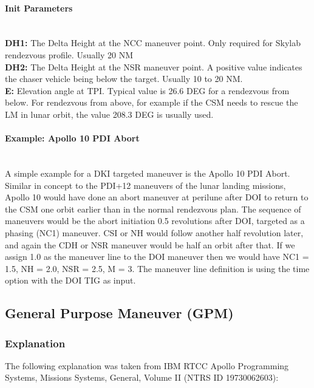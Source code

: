 \documentclass[11pt]{article} %
\begin{document}
\paragraph{Init Parameters}\mbox{} \\

\textbf{DH1:} The Delta Height at the NCC maneuver point. Only required for Skylab rendezvous profile. Usually 20 NM\\
\textbf{DH2:} The Delta Height at the NSR maneuver point. A positive value indicates the chaser vehicle being below the target. Usually 10 to 20 NM.\\
\textbf{E:} Elevation angle at TPI. Typical value is 26.6 DEG for a rendezvous from below. For rendezvous from above, for example if the CSM needs to rescue the LM in lunar orbit, the value 208.3 DEG is usually used.\\

\paragraph{Example: Apollo 10 PDI Abort}\mbox{} \\

A simple example for a DKI targeted maneuver is the Apollo 10 PDI Abort. Similar in concept to the PDI+12 maneuvers of the lunar landing missions, Apollo 10 would have done an abort maneuver at perilune after DOI to return to the CSM one orbit earlier than in the normal rendezvous plan. The sequence of maneuvers would be the abort initiation 0.5 revolutions after DOI, targeted as a phasing (NC1) maneuver. CSI or NH would follow another half revolution later, and again the CDH or NSR maneuver would be half an orbit after that. If we assign 1.0 as the maneuver line to the DOI maneuver then we would have NC1 = 1.5, NH = 2.0, NSR = 2.5, M = 3. The maneuver line definition is using the time option with the DOI TIG as input.

\newpage
\subsection{General Purpose Maneuver (GPM)}

\subsubsection{Explanation}

The following explanation was taken from IBM RTCC Apollo Programming Systems, Missions Systems, General, Volume II (NTRS ID 19730062603):
\end{document}
